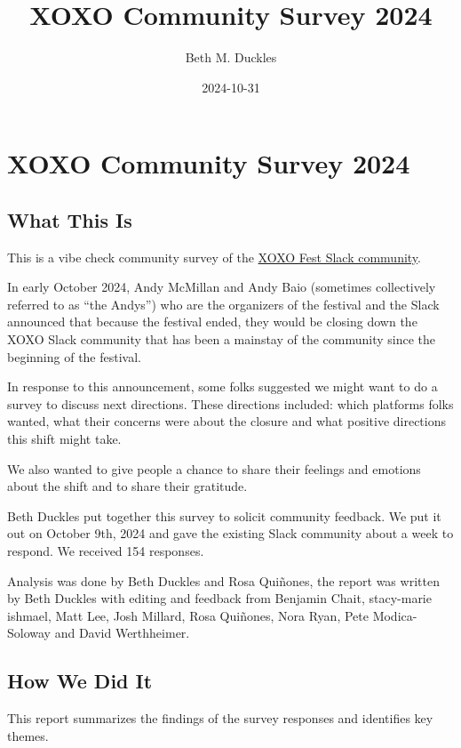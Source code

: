 \documentclass[
]{book}
\title{XOXO Community Survey 2024}
\author{Beth M. Duckles}
\date{2024-10-31}
\begin{document}
\maketitle

{
\setcounter{tocdepth}{1}
\tableofcontents
}
\chapter{XOXO Community Survey 2024}\label{xoxo-community-survey-2024}

\section{What This Is}\label{what-this-is}

This is a vibe check community survey of the \href{https://xoxofest.com/}{XOXO Fest Slack community}.

In early October 2024, Andy McMillan and Andy Baio (sometimes collectively referred to as ``the Andys'') who are the organizers of the festival and the Slack announced that because the festival ended, they would be closing down the XOXO Slack community that has been a mainstay of the community since the beginning of the festival.

In response to this announcement, some folks suggested we might want to do a survey to discuss next directions. These directions included: which platforms folks wanted, what their concerns were about the closure and what positive directions this shift might take.

We also wanted to give people a chance to share their feelings and emotions about the shift and to share their gratitude.

Beth Duckles put together this survey to solicit community feedback. We put it out on October 9th, 2024 and gave the existing Slack community about a week to respond. We received 154 responses.

Analysis was done by Beth Duckles and Rosa Quiñones, the report was written by Beth Duckles with editing and feedback from Benjamin Chait, stacy-marie ishmael, Matt Lee, Josh Millard, Rosa Quiñones, Nora Ryan, Pete Modica-Soloway and David Werthheimer.

\section{How We Did It}\label{how-we-did-it}

This report summarizes the findings of the survey responses and identifies key themes.
\end{document}
